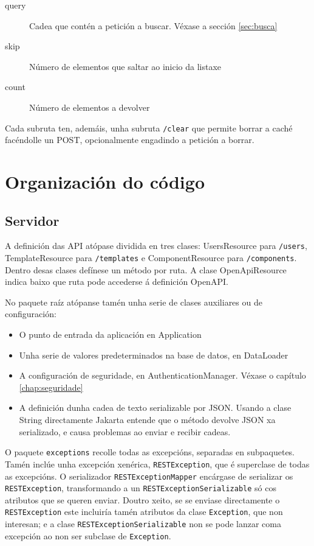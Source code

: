 \begin{description}
    \item[query] Cadea que contén a petición a buscar. Véxase a sección \ref{sec:busca}
    \item[skip] Número de elementos que saltar ao inicio da listaxe
    \item[count] Número de elementos a devolver
\end{description}

Cada subruta ten, ademáis, unha subruta \texttt{/clear} que permite borrar a caché facéndolle un POST, opcionalmente engadindo a petición a borrar.

\section{Organización do código}

\subsection{Servidor}

A definición das API atópase dividida en tres clases: UsersResource para \texttt{/users}, TemplateResource para \texttt{/templates} e ComponentResource para \texttt{/components}. Dentro desas clases defínese un método por ruta. A clase OpenApiResource indica baixo que ruta pode accederse á definición OpenAPI.

\newpage

No paquete raíz atópanse tamén unha serie de clases auxiliares ou de configuración:

\begin{itemize}
	\item O punto de entrada da aplicación en Application
	\item Unha serie de valores predeterminados na base de datos, en DataLoader
	\item A configuración de seguridade, en AuthenticationManager. Véxase o capítulo \ref{chap:seguridade}
	\item A definición dunha cadea de texto serializable por JSON. Usando a clase String directamente Jakarta entende que o método devolve JSON xa serializado, e causa problemas ao enviar e recibir cadeas.
\end{itemize}

O paquete \texttt{exceptions} recolle todas as excepcións, separadas en subpaquetes. Tamén inclúe unha excepción xenérica, \texttt{RESTException}, que é superclase de todas as excepcións. O serializador \texttt{RESTExceptionMapper} encárgase de serializar os \texttt{RESTException}, transformando a un \texttt{RESTExceptionSerializable} só cos atributos que se queren enviar. Doutro xeito, se se enviase directamente o \texttt{RESTException} este incluiría tamén atributos da clase \texttt{Exception}, que non interesan; e a clase \texttt{RESTExceptionSerializable} non se pode lanzar coma excepción ao non ser subclase de \texttt{Exception}.

